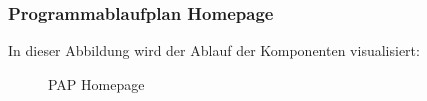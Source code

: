 \subsubsection{Programmablaufplan Homepage}
In dieser Abbildung wird der Ablauf der Komponenten visualisiert:
\begin{figure}[htbp]
	\centering
	\caption{PAP Homepage}
\end{figure}

